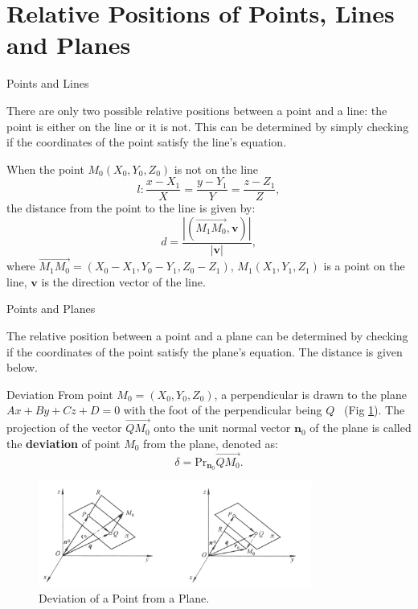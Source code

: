 \documentclass[11pt]{../../TexTemplate/elegantbook} %
\begin{document}
\section{Relative Positions of Points, Lines and Planes}
\begin{leftbarTitle}{Points and Lines}\end{leftbarTitle}
There are only two possible relative positions between a point and a line:
the point is either on the line or it is not.
This can be determined by simply checking if the coordinates of the point satisfy the line's equation.

When the point \(M_{0}(X_{0}, Y_{0}, Z_{0})\) is not on the line
\[
l: \frac{x - X_{1}}{X} = \frac{y - Y_{1}}{Y} = \frac{z - Z_{1}}{Z},
\]
the distance from the point to the line is given by:
\[
d = \frac{|(\vec{M_{1}M_{0}}, \mathbf{v})|}{|\mathbf{v}|},
\]
where \(\vec{M_{1}M_{0}} = (X_{0} - X_{1}, Y_{0} - Y_{1}, Z_{0} - Z_{1})\),
\(M_{1}(X_{1}, Y_{1}, Z_{1})\) is a point on the line,
\(\mathbf{v}\) is the direction vector of the line.



\begin{leftbarTitle}{Points and Planes}\end{leftbarTitle}
The relative position between a point and a plane 
can be determined by checking if the coordinates of the point satisfy the plane's equation.
The distance is given below.

\begin{definition}{Deviation}
    From point \(M_{0} = (X_{0}, Y_{0}, Z_{0})\), 
    a perpendicular is drawn to the plane \(A x + B y + C z + D = 0\) with the foot of the perpendicular being \(Q\)
    ~(Fig \ref{fig:DeviationOfPointFromPlane}). 
    The projection of the vector \(\vec{QM_{0}}\) onto the unit normal vector \(\mathbf{n}_{0}\) of the plane 
    is called the \textbf{deviation} of point \(M_{0}\) from the plane, 
    denoted as: 
    \[
    \delta = \mathrm{Pr}_{\mathbf{n}_{0}} \vec{QM_{0}}.
    \]
\end{definition}
\begin{figure}[h]
    \centering
    \includegraphics[width=0.8\textwidth]{img/deviation.png}
    \caption{Deviation of a Point from a Plane.}
    \label{fig:DeviationOfPointFromPlane}
\end{figure}
\end{document}
